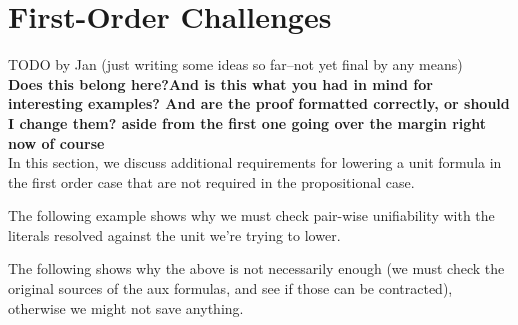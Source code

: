 


\section{First-Order Challenges}\label{sec:Challenges}

TODO by Jan (just writing some ideas so far--not yet final by any means)\\
{\bf Does this belong here?And is this what you had in mind for interesting examples? And are the proof formatted correctly, or should I change them? aside from the first one going over the margin right now of course}\\ 

In this section, we discuss additional requirements for lowering a unit formula in the first order case that are not required in the propositional case.



 \begin{example} The following example shows why we must check pair-wise unifiability with the literals resolved against the unit we're trying to lower.

 \end{example}



 \begin{example} The following shows why the above is not necessarily  enough (we must check the original sources of the aux formulas, and see if those can be contracted), otherwise we might not save anything.
 \end{example}


